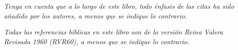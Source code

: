 \thispagestyle{empty}

\vspace*{1cm}

\begin{center}
    \textit{Tenga en cuenta que a lo largo de este libro, todo énfasis de las citas ha sido añadido por los autores, a menos que se indique lo contrario.}
    
    \textit{Todas las referencias bíblicas en este libro son de la versión Reina Valera Revisada 1960 (RVR60), a menos que se indique lo contrario.}
\end{center}

\cleardoublepage